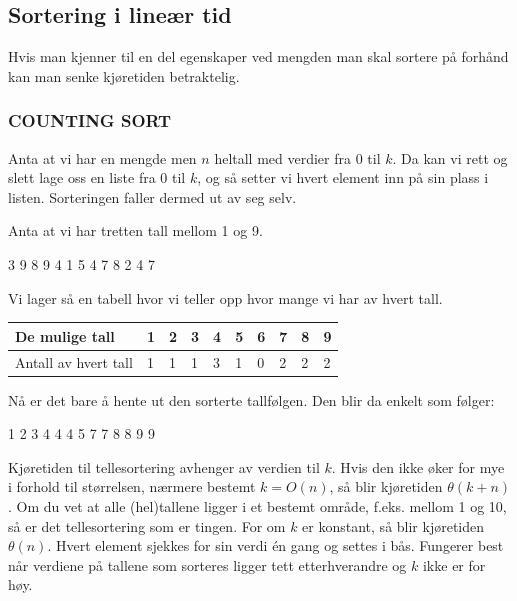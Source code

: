 \subsection{Sortering i lineær tid}
Hvis man kjenner til en del egenskaper ved mengden man skal sortere på forhånd kan man senke kjøretiden betraktelig.

\subsubsection{COUNTING SORT}
Anta at vi har en mengde men $n$ heltall med verdier fra 0 til $k$. Da kan vi rett og slett lage oss en liste fra 0 til $k$, og så setter vi hvert element inn på sin plass i listen. Sorteringen faller dermed ut av seg selv.

\begin{boxed}
Anta at vi har tretten tall mellom 1 og 9.
\begin{center}
3 9 8 9 4 1 5 4 7 8 2 4 7
\end{center}
Vi lager så en tabell hvor vi teller opp hvor mange vi har av hvert tall.

\begin{table}[H]
    \label{tab:tellesortering}
    \centering
    \begin{tabular}{|L{10em} | L{2em}|L{2em}|L{2em}|L{2em}|L{2em}|L{2em}|L{2em}|L{2em}|L{2em}|}
        \hline
        De mulige tall & 1 & 2 & 3 & 4 & 5 & 6 & 7 & 8 & 9\\
        \hline
        Antall av hvert tall & 1 & 1 & 1 & 3 & 1 & 0 & 2 & 2 & 2\\
         \hline
    \end{tabular}
\end{table}
Nå er det bare å hente ut den sorterte tallfølgen. Den blir da enkelt som følger:
\begin{center}
1 2 3 4 4 4 5 7 7 8 8 9 9
\end{center}
\end{boxed}

\noindent Kjøretiden til tellesortering avhenger av verdien til $k$. Hvis den ikke øker for mye i forhold til størrelsen, nærmere bestemt $k = O(n)$, så blir kjøretiden $\theta(k + n)$. Om du vet at alle (hel)tallene ligger i et bestemt område, f.eks. mellom 1 og 10, så er det tellesortering som er tingen. For om $k$ er konstant, så blir kjøretiden $\theta(n)$. Hvert element sjekkes for sin verdi én gang og settes i bås. Fungerer best når verdiene på tallene som sorteres ligger tett etterhverandre og $k$ ikke er for høy.

